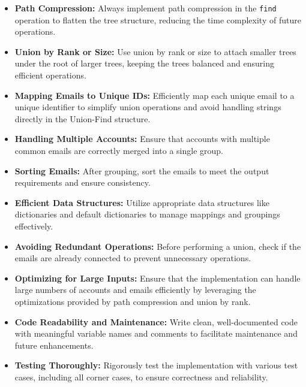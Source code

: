 \begin{itemize}
    \item \textbf{Path Compression:}  
    Always implement path compression in the \texttt{find} operation to flatten the tree structure, reducing the time complexity of future operations.
    
    \item \textbf{Union by Rank or Size:}  
    Use union by rank or size to attach smaller trees under the root of larger trees, keeping the trees balanced and ensuring efficient operations.
    
    \item \textbf{Mapping Emails to Unique IDs:}  
    Efficiently map each unique email to a unique identifier to simplify union operations and avoid handling strings directly in the Union-Find structure.
    
    \item \textbf{Handling Multiple Accounts:} 
    Ensure that accounts with multiple common emails are correctly merged into a single group.
    
    \item \textbf{Sorting Emails:} 
    After grouping, sort the emails to meet the output requirements and ensure consistency.
    
    \item \textbf{Efficient Data Structures:} 
    Utilize appropriate data structures like dictionaries and default dictionaries to manage mappings and groupings effectively.
    
    \item \textbf{Avoiding Redundant Operations:} 
    Before performing a union, check if the emails are already connected to prevent unnecessary operations.
    
    \item \textbf{Optimizing for Large Inputs:} 
    Ensure that the implementation can handle large numbers of accounts and emails efficiently by leveraging the optimizations provided by path compression and union by rank.
    
    \item \textbf{Code Readability and Maintenance:} 
    Write clean, well-documented code with meaningful variable names and comments to facilitate maintenance and future enhancements.
    
    \item \textbf{Testing Thoroughly:} 
    Rigorously test the implementation with various test cases, including all corner cases, to ensure correctness and reliability.
\end{itemize}

